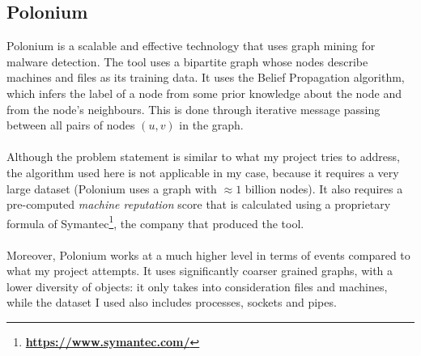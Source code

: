 	\subsection{Polonium}
	Polonium is a scalable and effective technology that uses graph mining for malware detection. The tool uses a bipartite graph whose nodes describe machines and files as its training data. It uses the Belief Propagation algorithm, which infers the label of a node from some prior knowledge about the node and from the node's neighbours. This is done through iterative message passing between all pairs of nodes $(u, v)$ in the graph. 
	\\ \\
	Although the problem statement is similar to what my project tries to address, the algorithm used here is not applicable in my case, because it requires a very large dataset (Polonium uses a graph with $\approx 1$ billion nodes). It also requires a pre-computed \textit{machine reputation} score that is calculated using a proprietary formula of Symantec\footnote{\textbf{\url{https://www.symantec.com/}}}, the company that produced the tool. 
	\\ \\
	Moreover, Polonium works at a much higher level in terms of events compared to what my project attempts. It uses significantly coarser grained graphs, with a lower diversity of objects: it only takes into consideration files and machines, while the dataset I used also includes processes, sockets and pipes. 

